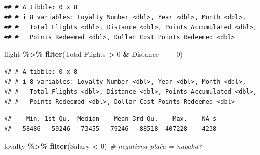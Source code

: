 \documentclass[
]{article}
\newenvironment{Shaded}{\begin{snugshade}}{\end{snugshade}}
\newcommand{\AttributeTok}[1]{\textcolor[rgb]{0.13,0.29,0.53}{#1}}
\newcommand{\CommentTok}[1]{\textcolor[rgb]{0.56,0.35,0.01}{\textit{#1}}}
\newcommand{\DecValTok}[1]{\textcolor[rgb]{0.00,0.00,0.81}{#1}}
\newcommand{\FunctionTok}[1]{\textcolor[rgb]{0.13,0.29,0.53}{\textbf{#1}}}
\newcommand{\NormalTok}[1]{#1}
\newcommand{\SpecialCharTok}[1]{\textcolor[rgb]{0.81,0.36,0.00}{\textbf{#1}}}
\newcommand{\StringTok}[1]{\textcolor[rgb]{0.31,0.60,0.02}{#1}}
\begin{document}
\begin{verbatim}
## # A tibble: 0 x 8
## # i 8 variables: Loyalty Number <dbl>, Year <dbl>, Month <dbl>,
## #   Total Flights <dbl>, Distance <dbl>, Points Accumulated <dbl>,
## #   Points Redeemed <dbl>, Dollar Cost Points Redeemed <dbl>
\end{verbatim}

\begin{Shaded}
\begin{Highlighting}[]
\NormalTok{flight }\SpecialCharTok{\%\textgreater{}\%} \FunctionTok{filter}\NormalTok{(}\StringTok{\textasciigrave{}}\AttributeTok{Total Flights}\StringTok{\textasciigrave{}} \SpecialCharTok{\textgreater{}} \DecValTok{0} \SpecialCharTok{\&}\NormalTok{ Distance }\SpecialCharTok{==} \DecValTok{0}\NormalTok{)}
\end{Highlighting}
\end{Shaded}

\begin{verbatim}
## # A tibble: 0 x 8
## # i 8 variables: Loyalty Number <dbl>, Year <dbl>, Month <dbl>,
## #   Total Flights <dbl>, Distance <dbl>, Points Accumulated <dbl>,
## #   Points Redeemed <dbl>, Dollar Cost Points Redeemed <dbl>
\end{verbatim}

\begin{Shaded}
\end{Shaded}

\begin{verbatim}
##    Min. 1st Qu.  Median    Mean 3rd Qu.    Max.    NA's 
##  -58486   59246   73455   79246   88518  407228    4238
\end{verbatim}

\begin{Shaded}
\begin{Highlighting}[]
\NormalTok{loyalty }\SpecialCharTok{\%\textgreater{}\%} \FunctionTok{filter}\NormalTok{(Salary }\SpecialCharTok{\textless{}} \DecValTok{0}\NormalTok{) }\CommentTok{\# negativna plača = napaka?}
\end{Highlighting}
\end{Shaded}
\end{document}
